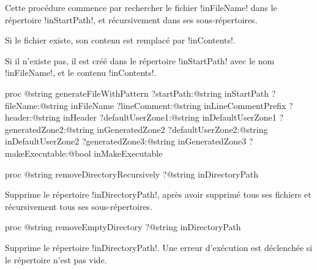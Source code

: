 Cette procédure commence par rechercher le fichier \ggst!inFileName! dans le répertoire \ggst!inStartPath!, et récursivement dans ses sous-répertoires.

Si le fichier existe, son contenu est remplacé par \ggst!inContents!.

Si il n'existe pas, il est créé dans le répertoire \ggst!inStartPath! avec le nom \ggst!inFileName!, et le contenu \ggst!inContents!.










\begin{galgas3box}
proc @string generateFileWithPattern
   ?startPath:@string inStartPath
   ?fileName:@string inFileName
   ?lineComment:@string inLineCommentPrefix
   ?header:@string inHeader
   ?defaultUserZone1:@string inDefaultUserZone1
   ?generatedZone2:@string inGeneratedZone2
   ?defaultUserZone2:@string inDefaultUserZone2
   ?generatedZone3:@string inGeneratedZone3
   ?makeExecutable:@bool inMakeExecutable
\end{galgas3box}








\begin{galgas3box}
proc @string removeDirectoryRecursively ?@string inDirectoryPath
\end{galgas3box}

Supprime le répertoire \ggst!inDirectoryPath!, après avoir supprimé tous ses fichiers et récursivement tous ses sous-répertoires.









\begin{galgas3box}
proc @string removeEmptyDirectory ?@string inDirectoryPath
\end{galgas3box}

Supprime le répertoire \ggst!inDirectoryPath!. Une erreur d'exécution est déclenchée si le répertoire n'est pas vide.


